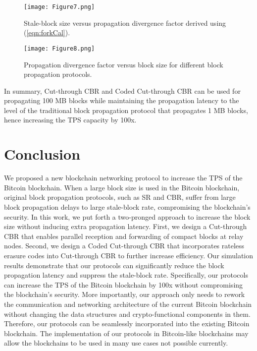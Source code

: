 \documentclass[10pt,journal,compsoc]{IEEEtran}
\begin{document}
\begin{figure}[!t]
	\centering
	\texttt{[image: Figure7.png]}
	\caption{Stale-block size versus propagation divergence factor derived using (\ref{eqn:forkCal}).}
	\label{fig_7}
\end{figure}

\begin{figure}[!t]
	\centering
	\texttt{[image: Figure8.png]}
	\caption{Propagation divergence factor versus block size for different block propagation protocols.}
	\label{fig_8}
\end{figure}

In summary, Cut-through CBR and Coded Cut-through CBR can be used for propagating 100 MB blocks while maintaining the propagation latency to the level of the traditional block propagation protocol that propagates 1 MB blocks, hence increasing the TPS capacity by 100x. 

\section{Conclusion}
\label{section:conclusion}
We proposed a new blockchain networking protocol  to increase the TPS of the Bitcoin blockchain. When a large block size is used in the Bitcoin blockchain, original block propagation protocols, such as SR and CBR, suffer from large block propagation delays to large stale-block rate, compromising the blockchain's security. In this work, we put forth a two-pronged approach to increase the block size without inducing extra propagation latency. First, we design a Cut-through CBR that enables parallel reception and forwarding of compact blocks at relay nodes. Second, we design a Coded Cut-through CBR that incorporates rateless erasure codes into Cut-through CBR to further increase efficiency. Our simulation results demonstrate that our protocols can significantly reduce the block propagation latency and suppress the stale-block rate. Specifically, our protocols can increase the TPS of the Bitcoin blockchain by 100x without compromising the blockchain's security. More importantly, our approach only needs to rework the communication and networking architecture of the current Bitcoin blockchain without changing the data structures and crypto-functional components in them. Therefore, our protocols can be seamlessly incorporated into the existing Bitcoin blockchain. The implementation of our protocols in Bitcoin-like blockchains may allow the blockchains to be used in many use cases not possible currently. 
\ifCLASSOPTIONcaptionsoff
  \newpage
\fi
\end{document}
